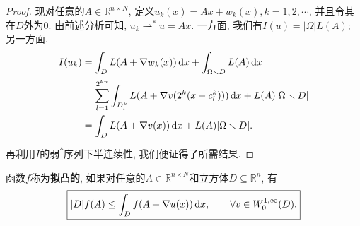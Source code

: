 \begin{proposition}
\begin{proof}
        现对任意的$A \in \mathbb{R}^{n \times N}$, 定义$u_k(x)= Ax + w_k(x), k = 1, 2, \cdots$, 并且令其在$D$外为0.
        由前述分析可知, $u_k \rightharpoonup^* u = Ax$. 一方面, 我们有$I(u) = |\Omega|L(A)$; 另一方面, 
        \begin{align*}
            I(u_k) &= \int_DL(A + \nabla w_k(x)) \,{\rm d}x + \int_{\Omega\smallsetminus D}L(A) \,{\rm d}x \\ 
            &= \sum_{l = 1}^{2^{kn}}\int_{D^k_l}L(A + \nabla v(2^k(x - c_l^k))) \,{\rm d}x + L(A)|\Omega \smallsetminus D| \\ 
            &= \int_DL(A + \nabla v(x)) \,{\rm d}x + L(A)|\Omega \smallsetminus D|.
        \end{align*}
        再利用$I$的弱\textsuperscript{*}序列下半连续性, 我们便证得了所需结果.
    \end{proof}
\end{proposition}

\begin{definition}
    函数$f$称为\textbf{拟凸的}, 如果对任意的$A \in \mathbb{R}^{n \times N}$和立方体$D \subseteq \mathbb{R}^n$, 有 
    \begin{equation*}
        \boxed{|D|f(A) \leq \int_Df(A + \nabla u(x)) \,{\rm d}x, \qquad \forall v \in W_0^{1, \infty}(D).}
    \end{equation*}
\end{definition}

